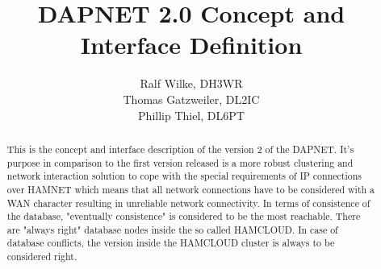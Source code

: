 \documentclass[a4paper]{report}
\title{DAPNET 2.0 Concept and Interface Definition}
\author{
Ralf Wilke, DH3WR\\
Thomas Gatzweiler, DL2IC\\
Phillip Thiel, DL6PT
}
\begin{document}
\maketitle
\begin{abstract}
This is the concept and interface description of the version 2 of the DAPNET. It's purpose in comparison to the first version released is a more robust clustering and network interaction solution to cope with the special requirements of IP connections over HAMNET which means that all network connections have to be considered with a WAN character resulting in unreliable network connectivity. In terms of consistence of the database, "eventually consistence" is considered to be the most reachable. There are "always right" database nodes inside the so called HAMCLOUD. In case of database conflicts, the version inside the HAMCLOUD cluster is always to be considered right.
\end{abstract}








\end{document}
